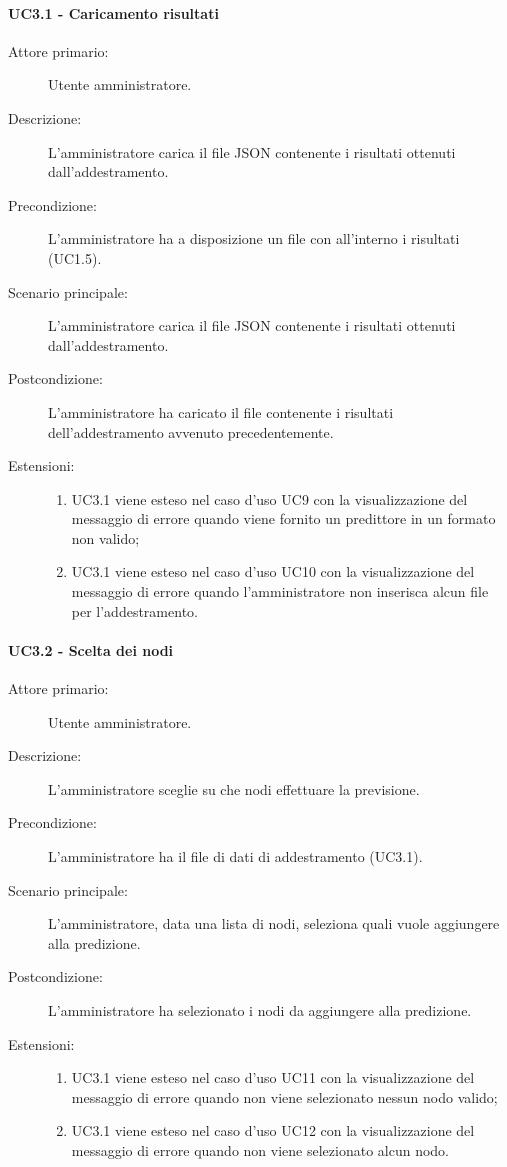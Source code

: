 \paragraph{UC3.1 - Caricamento risultati}
\label{sssec:uc3.1}
\begin{description}
  \item[Attore primario:] Utente amministratore.
  \item[Descrizione:] L'amministratore carica il file JSON contenente i risultati ottenuti dall'addestramento.
  \item[Precondizione:] L'amministratore ha a disposizione un file con all'interno i risultati (UC1.5).
  \item[Scenario principale:] L'amministratore carica il file JSON contenente i risultati ottenuti dall'addestramento.
  \item[Postcondizione:] L'amministratore ha caricato il file contenente i risultati dell'addestramento avvenuto precedentemente.
  \item[Estensioni:]
  \begin{enumerate}
	\item UC3.1 viene esteso nel caso d'uso UC9 con la visualizzazione del messaggio di errore quando viene fornito un predittore in un formato non valido;
	\item UC3.1 viene esteso nel caso d'uso UC10 con la visualizzazione del messaggio di errore quando l'amministratore non inserisca alcun file per l'addestramento.
  \end{enumerate}
\end{description}

\paragraph{UC3.2 - Scelta dei nodi}
\label{sssec:uc3.2}
\begin{description}
  \item[Attore primario:] Utente amministratore.
  \item[Descrizione:] L'amministratore sceglie su che nodi effettuare la previsione.
  \item[Precondizione:] L'amministratore ha il file di dati di addestramento (UC3.1).
  \item[Scenario principale:] L'amministratore, data una lista di nodi, seleziona quali vuole aggiungere alla predizione.
  \item[Postcondizione:] L'amministratore ha selezionato i nodi da aggiungere alla predizione.
  \item[Estensioni:]
  \begin{enumerate}
	\item UC3.1 viene esteso nel caso d'uso UC11 con la visualizzazione del messaggio di errore quando non viene selezionato nessun nodo valido;
	\item UC3.1 viene esteso nel caso d'uso UC12 con la visualizzazione del messaggio di errore quando non viene selezionato alcun nodo.
  \end{enumerate}
\end{description}

